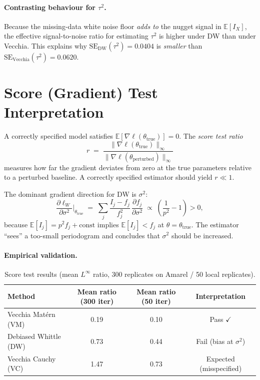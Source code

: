 \documentclass[12pt]{article}
\begin{document}
\paragraph{Contrasting behaviour for $\tau^2$.}
Because the missing-data white noise floor \emph{adds to} the nugget
signal in $\mathbb{E}[I_X]$, the effective signal-to-noise ratio for
estimating $\tau^2$ is higher under DW than under Vecchia.
This explains why $\mathrm{SE}_{\mathrm{DW}}(\tau^2) = 0.0404$ is
\emph{smaller} than $\mathrm{SE}_{\mathrm{Vecchia}}(\tau^2) = 0.0620$.


\section{Score (Gradient) Test Interpretation}

A correctly specified model satisfies $\mathbb{E}[\nabla\ell(\theta_{\mathrm{true}})] = 0$.
The \emph{score test ratio}
\[
  r \;=\; \frac{\|\nabla\ell(\theta_{\mathrm{true}})\|_\infty}
               {\|\nabla\ell(\theta_{\mathrm{perturbed}})\|_\infty}
\]
measures how far the gradient deviates from zero at the true parameters
relative to a perturbed baseline.  A correctly specified estimator
should yield $r \ll 1$.

The dominant gradient direction for DW is $\sigma^2$:
\[
  \frac{\partial \ell_W}{\partial \sigma^2}\bigg|_{\theta_{\mathrm{true}}}
  \;=\; \sum_j \frac{I_j - f_j}{f_j^2}\,\frac{\partial f_j}{\partial \sigma^2}
  \;\propto\; \left(\frac{1}{p^2} - 1\right) > 0,
\]
because $\mathbb{E}[I_j] = p^2 f_j + \text{const}$ implies
$\mathbb{E}[I_j] < f_j$ at $\theta = \theta_{\mathrm{true}}$.
The estimator ``sees'' a too-small periodogram and concludes that
$\sigma^2$ should be increased.

\paragraph{Empirical validation.}

\begin{table}[h]
\centering
\caption{Score test results (mean $L^\infty$ ratio, 300 replicates on Amarel
         / 50 local replicates).}
\begin{tabular}{lccc}
\toprule
Method & Mean ratio (300 iter) & Mean ratio (50 iter) & Interpretation \\
\midrule
Vecchia Matérn (VM) & 0.19 & 0.10 & Pass $\checkmark$ \\
Debiased Whittle (DW) & 0.73 & 0.44 & Fail (bias at $\sigma^2$) \\
Vecchia Cauchy (VC) & 1.47 & 0.73 & Expected (misspecified) \\
\bottomrule
\end{tabular}
\label{tab:score_test}
\end{table}
\end{document}
